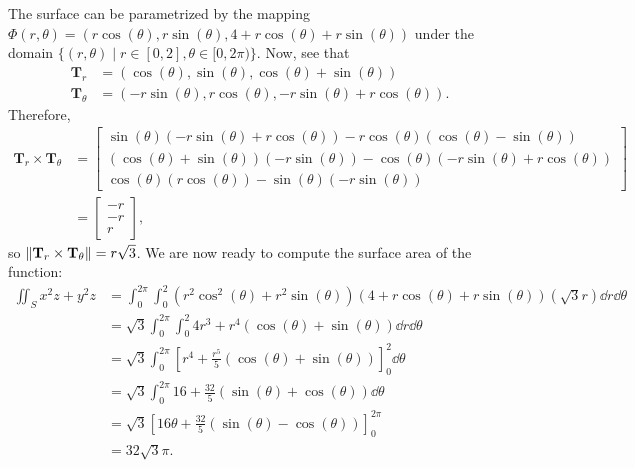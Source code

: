 \documentclass[11pt]{article}
\begin{document}
The surface can be parametrized by the mapping $\Phi(r, \theta) = (r \cos(\theta), r \sin(\theta), 4 + r \cos(\theta) + r \sin(\theta))$ under the domain $\{ (r, \theta) \mid r \in [0, 2], \theta \in [0, 2\pi) \}$. Now, see that
\begin{align*}
	\mathbf{T}_{r} &= (\cos(\theta), \sin(\theta), \cos(\theta) + \sin(\theta)) \\
	\mathbf{T}_{\theta} &= (-r \sin(\theta), r \cos(\theta), -r \sin(\theta) + r \cos(\theta)).
\end{align*}
Therefore,
\begin{align*}
	\mathbf{T}_{r} \times \mathbf{T}_{\theta} &= \begin{bmatrix} \sin(\theta) (-r \sin(\theta) + r \cos(\theta)) - r \cos(\theta) (\cos(\theta) - \sin(\theta)) \\ (\cos(\theta) + \sin(\theta))(-r \sin(\theta)) - \cos(\theta)(-r \sin(\theta) + r \cos(\theta)) \\ \cos(\theta)(r \cos(\theta)) - \sin(\theta) (- r \sin(\theta) )\end{bmatrix} \\
	&= \begin{bmatrix} -r \\ - r \\ r \end{bmatrix},
\end{align*}
so $\norm{\mathbf{T}_{r} \times \mathbf{T}_{\theta}} = r \sqrt{3}$. We are now ready to compute the surface area of the function:
\begin{align*}
	\iint_{S} x^{2}z + y^{2}z &= \int_{0}^{2\pi} \int_{0}^{2} \left( r^{2} \cos^{2}(\theta) + r^{2} \sin(\theta) \right) \left( 4 + r \cos(\theta) + r \sin(\theta) \right)  \left( \sqrt{3} r \right) \dd{r} \dd{\theta} \\
	&= \sqrt{3} \int_{0}^{2\pi} \int_{0}^{2} 4r^{3} + r^{4}(\cos(\theta) + \sin(\theta)) \dd{r} \dd{\theta} \\
	&= \sqrt{3} \int_{0}^{2\pi} \left[ r^{4} + \frac{r^{5}}{5}(\cos(\theta) + \sin(\theta)) \right]_{0}^{2} \dd{\theta} \\
	&= \sqrt{3} \int_{0}^{2\pi} 16 + \frac{32}{5} \left( \sin(\theta) + \cos(\theta) \right) \dd{\theta} \\
	&= \sqrt{3} \left[ 16\theta + \frac{32}{5} (\sin(\theta) - \cos(\theta)) \right]_{0}^{2\pi} \\
	&= \boxed{32 \sqrt{3}\pi}.
\end{align*}

\end{document}
